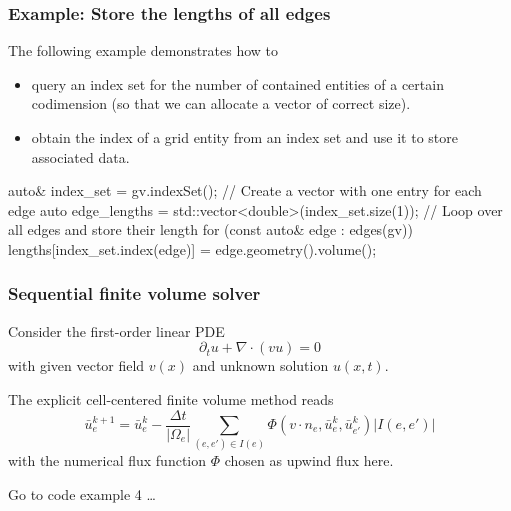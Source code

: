 \documentclass[aspectratio=169,11pt]{beamer}
\theoremstyle{definition}
\begin{document}
\begin{frame}[fragile]
  \frametitle{Example: Store the lengths of all edges}
  The following example demonstrates how to
  \begin{itemize}
  \item query an index set for the number of contained
    entities of a certain codimension (so that we can allocate a vector of correct size).
  \item obtain the index of a grid entity from an index set and use it to store associated data.
  \end{itemize}
  \begin{cppcode}
auto& index_set = gv.indexSet();
// Create a vector with one entry for each edge
auto edge_lengths = std::vector<double>(index_set.size(1));
// Loop over all edges and store their length
for (const auto& edge : edges(gv))
  lengths[index_set.index(edge)] = edge.geometry().volume();
\end{cppcode}
\end{frame}

\begin{frame}[fragile]
  \frametitle{Sequential finite volume solver}
Consider the first-order linear PDE
$$ \partial_t u + \nabla\cdot(vu) = 0$$
with given vector field $v(x)$ and unknown solution $u(x,t)$.

The explicit cell-centered finite volume method reads
$$ \bar{u}_e^{k+1} = \bar{u}_e^{k} - \frac{\Delta t}{|\Omega_e|} \sum_{(e,e')\in I(e)}
\Phi(v\cdot n_e,\bar{u}_e^{k},\bar{u}_{e'}^{k}) |I(e,e')|$$
with the numerical flux function $\Phi$ chosen as upwind flux here.

\begin{center}
Go to code example 4 \ldots
\end{center}
\end{frame}
\end{document}
